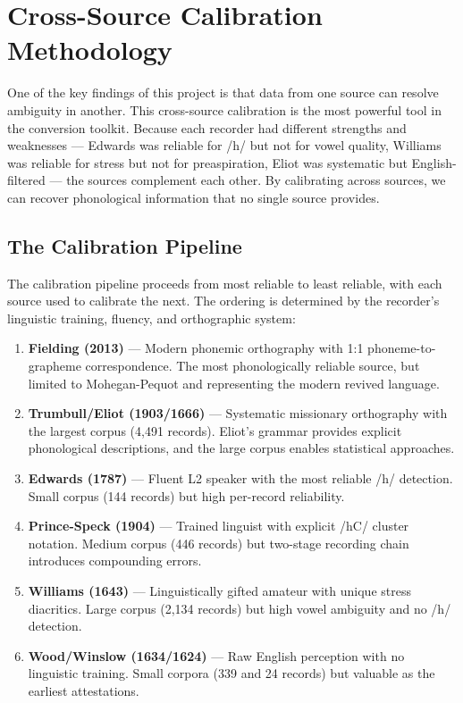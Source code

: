 
\section{Cross-Source Calibration Methodology}
\label{sec:calibration}

One of the key findings of this project is that data from one source can
resolve ambiguity in another. This cross-source calibration is the most
powerful tool in the conversion toolkit. Because each recorder had different
strengths and weaknesses --- Edwards was reliable for /h/ but not for vowel
quality, Williams was reliable for stress but not for preaspiration, Eliot
was systematic but English-filtered --- the sources complement each other.
By calibrating across sources, we can recover phonological information that
no single source provides.

\subsection{The Calibration Pipeline}

The calibration pipeline proceeds from most reliable to least reliable, with
each source used to calibrate the next. The ordering is determined by the
recorder's linguistic training, fluency, and orthographic system:

\begin{enumerate}
  \item \textbf{Fielding (2013)} --- Modern phonemic orthography with 1:1
    phoneme-to-grapheme correspondence. The most phonologically reliable
    source, but limited to Mohegan-Pequot and representing the modern
    revived language.

  \item \textbf{Trumbull/Eliot (1903/1666)} --- Systematic missionary
    orthography with the largest corpus (4,491 records). Eliot's grammar
    provides explicit phonological descriptions, and the large corpus enables
    statistical approaches.

  \item \textbf{Edwards (1787)} --- Fluent L2 speaker with the most reliable
    /h/ detection. Small corpus (144 records) but high per-record
    reliability.

  \item \textbf{Prince-Speck (1904)} --- Trained linguist with explicit /hC/
    cluster notation. Medium corpus (446 records) but two-stage recording
    chain introduces compounding errors.

  \item \textbf{Williams (1643)} --- Linguistically gifted amateur with
    unique stress diacritics. Large corpus (2,134 records) but high vowel
    ambiguity and no /h/ detection.

  \item \textbf{Wood/Winslow (1634/1624)} --- Raw English perception with no
    linguistic training. Small corpora (339 and 24 records) but valuable as
    the earliest attestations.
\end{enumerate}

